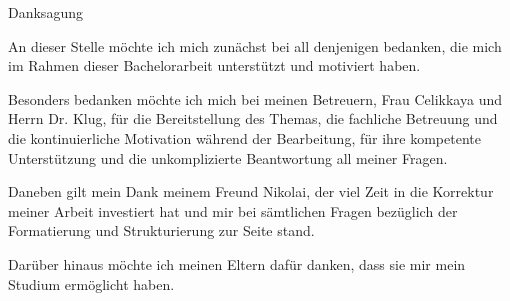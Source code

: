 \thispagestyle{empty}

\vspace*{2cm}

\begin{center}
{ Danksagung}
\end{center}

\vspace{1cm}


An dieser Stelle möchte ich mich zunächst bei all denjenigen bedanken, die mich im Rahmen dieser Bachelorarbeit unterstützt und motiviert haben.

Besonders bedanken möchte ich mich bei meinen Betreuern, Frau Celikkaya und Herrn Dr. Klug, für die Bereitstellung des Themas, die fachliche Betreuung und die kontinuierliche Motivation während der Bearbeitung, für ihre kompetente Unterstützung und die unkomplizierte Beantwortung all meiner Fragen. 

Daneben gilt mein Dank meinem Freund Nikolai, der viel Zeit in die Korrektur meiner Arbeit investiert hat und mir bei sämtlichen Fragen bezüglich der Formatierung und Strukturierung zur Seite stand.

Darüber hinaus möchte ich meinen Eltern dafür danken, dass sie mir mein Studium ermöglicht haben. 

\cleardoublepage{}
